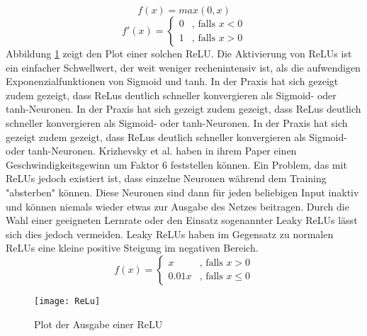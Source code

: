 \begin{equation}
	f(x) = max(0, x)
\end{equation}
\begin{equation*}
	f'(x) = \begin{cases}
	0 &\text{, falls $x < 0$}\\
	1 &\text{, falls $x > 0$}
	\end{cases}
\end{equation*}
	Abbildung \ref{reluoutput} zeigt den Plot einer solchen ReLU.
	Die Aktivierung von ReLUs ist ein einfacher Schwellwert, der weit weniger rechenintensiv ist, als die aufwendigen Exponenzialfunktionen von Sigmoid und tanh.
	In der Praxis hat sich gezeigt zudem gezeigt, dass ReLus deutlich schneller konvergieren als Sigmoid- oder tanh-Neuronen. 
		In der Praxis hat sich gezeigt zudem gezeigt, dass ReLus deutlich schneller konvergieren als Sigmoid- oder tanh-Neuronen. 
	In der Praxis hat sich gezeigt zudem gezeigt, dass ReLus deutlich schneller konvergieren als Sigmoid- oder tanh-Neuronen. 
	Krizhevsky et al. haben in ihrem Paper\cite{NIPS2012_4824} einen Geschwindigkeitsgewinn um Faktor 6 feststellen können.
	Ein Problem, das mit ReLUs jedoch existiert ist, dass einzelne Neuronen während dem Training "absterben" können.
	Diese Neuronen sind dann für jeden beliebigen Input inaktiv und können niemals wieder etwas zur Ausgabe des Netzes beitragen.
	Durch die Wahl einer geeigneten Lernrate oder den Einsatz sogenannter Leaky ReLUs lässt sich dies jedoch vermeiden.
	Leaky ReLUs haben im Gegensatz zu normalen ReLUs eine kleine positive Steigung im negativen Bereich.
	\begin{equation}
		f(x) = \begin{cases}
			x &\text{, falls } x  >  0\\
			0.01 x &\text{, falls } x  \leq  0
		\end{cases}
	\end{equation} 
	

	\begin{figure}
		\centering
		\texttt{[image: ReLu]}
		\caption{Plot der Ausgabe einer ReLU}
		\label{reluoutput}
	\end{figure}




